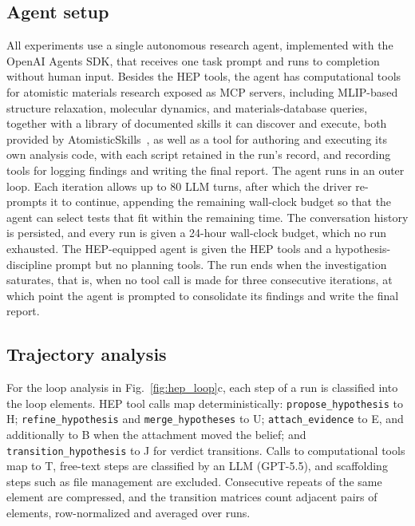 \subsection{Agent setup}
All experiments use a single autonomous research agent, implemented
with the OpenAI Agents SDK, that receives one task prompt and runs to
completion without human input.
Besides the HEP tools, the agent has computational tools for
atomistic materials research exposed as MCP servers, including
MLIP-based structure relaxation, molecular dynamics, and
materials-database queries, together with a library of documented
skills it can discover and execute, both provided by
AtomisticSkills~\cite{Deng2026AtomisticSkills}, as well as a tool for
authoring and executing its own analysis code, with each script
retained in the run's record, and recording tools for logging findings
and writing the final report.
The agent runs in an outer loop.
Each iteration allows up to 80 LLM
turns, after which the driver re-prompts it to continue, appending the
remaining wall-clock budget so that the agent can select tests that
fit within the remaining time.
The conversation history is persisted,
and every run is given a 24-hour wall-clock budget, which no run
exhausted.
The HEP-equipped agent is given the HEP tools and a
hypothesis-discipline prompt but no planning tools.
The run ends when
the investigation saturates, that is, when no tool call is made for
three consecutive iterations, at which point the agent is prompted to
consolidate its findings and write the final report.

\subsection{Trajectory analysis}
For the loop analysis in Fig.~\ref{fig:hep_loop}c, each step of a run
is classified into the loop elements.
HEP tool calls map deterministically: \texttt{propose\_hypothesis} to
H; \texttt{refine\_hypothesis} and \texttt{merge\_hypotheses} to U;
\texttt{attach\_evidence} to E, and additionally to B when the
attachment moved the belief; and \texttt{transition\_hypothesis} to J
for verdict transitions.
Calls to computational tools map to T, free-text steps are classified
by an LLM (GPT-5.5), and scaffolding steps such as file management are
excluded.
Consecutive repeats of the same element are compressed, and the
transition matrices count adjacent pairs of elements, row-normalized
and averaged over runs.

